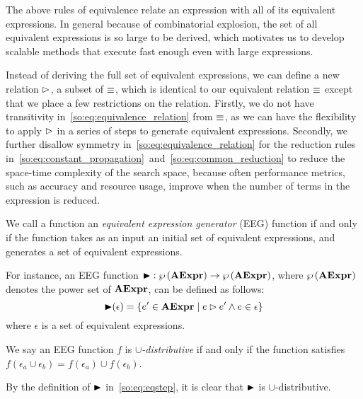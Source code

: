 The above rules of equivalence relate an expression with all of its equivalent
expressions.  In general because of combinatorial explosion, the set of all
equivalent expressions is so large to be derived, which motivates us to develop
scalable methods that execute fast enough even with large expressions.

Instead of deriving the full set of equivalent expressions, we can
define a new relation $\mathbin{\rhd}$, a subset of $\equiv$, which
is identical to our equivalent relation $\equiv$ except that we
place a few restrictions on the relation.  Firstly, we do not have
transitivity in~\eqref{so:eq:equivalence_relation} from $\equiv$, as
we can have the flexibility to apply $\mathbin{\rhd}$ in a series of steps
to generate equivalent expressions.  Secondly, we further disallow
symmetry in~\eqref{so:eq:equivalence_relation} for the reduction rules
in~\ref{so:eq:constant_propagation}~and~\ref{so:eq:common_reduction} to reduce
the space-time complexity of the search space, because often performance
metrics, such as accuracy and resource usage, improve when the number of terms
in the expression is reduced.

\begin{definition}
    We call a function an \emph{equivalent expression generator} (EEG) function
if and only if the function takes as an input an initial set of equivalent
expressions, and generates a set of equivalent expressions.
\end{definition}

For instance, an EEG function $\operatorname{\blacktriangleright}: \wp\left({\mathbf{AExpr}}\right) \to
\wp\left({\mathbf{AExpr}}\right)$, where $\wp\left({\mathbf{AExpr}}\right)$ denotes the power set of
$\mathbf{AExpr}$, can be defined as follows:
\begin{equation}
    \operatorname{\blacktriangleright}(\epsilon) = \left\{
        e^\prime\in\mathbf{AExpr} \mid
        e \mathbin{\rhd} e^\prime \wedge e\in\epsilon\right\}
    \label{so:eq:eqstep}
\end{equation}
where $\epsilon$ is a set of equivalent expressions.

\begin{definition}
    We say an EEG function $f$ is \emph{$\cup$-distributive} if and only if
    the function satisfies $f(\epsilon_a \cup \epsilon_b) = f(\epsilon_a) \cup
    f(\epsilon_b)$.
\end{definition}
\begin{corollary}
    By the definition of $\operatorname{\blacktriangleright}$ in~\eqref{so:eq:eqstep}, it is clear that
    $\operatorname{\blacktriangleright}$ is $\cup$-distributive.
    {}\label{so:cor:union}
\end{corollary}

